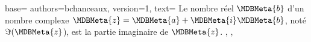 {
  base={
    authors={bchanceaux},
    version={1},
    text={%
      Le nombre réel $\MDBMeta{b}$ d'un nombre complexe
      $\MDBMeta{z} = \MDBMeta{a} + \MDBMeta{i} \MDBMeta{b}$, noté \(\Im(\MDBMeta{z}\)), est la partie imaginaire de \(\MDBMeta{z}\).
    },
  },
}
